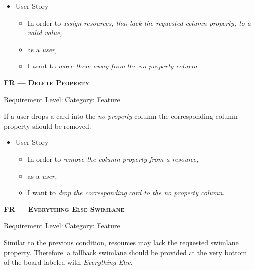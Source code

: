 \begin{itemize}[after=\vspace{1em}]
    \setlength\itemsep{-0.5em}
	\item[] User Story\\[-7.8mm]
	\begin{itemize}
    \setlength\itemsep{-0.5em}
        \item[] In order to \textit{assign resources, that lack the requested column property, to a valid value,}
        \item[] as a \textit{user,}
        \item[] I want to \textit{move them away from the no property column.}
    \end{itemize}
\end{itemize}




\centerline{\textbf{FR\textsubscript{} --- \textsc{Delete Property}}}
\centerline{\small Requirement Level:  \quad{} Category: Feature}

\noindent If a user drops a card into the \textit{no property} column the corresponding column property should be removed.

\begin{itemize}[after=\vspace{1em}]
    \setlength\itemsep{-0.5em}
	\item[] User Story\\[-7.8mm]
	\begin{itemize}
    \setlength\itemsep{-0.5em}
        \item[] In order to \textit{remove the column property from a resource,}
        \item[] as a \textit{user,}
        \item[] I want to \textit{drop the corresponding card to the no property column.}
    \end{itemize}
\end{itemize}





\centerline{\textbf{FR\textsubscript{} --- \textsc{Everything Else Swimlane}}}
\centerline{\small Requirement Level:  \quad{} Category: Feature}

\noindent Similar to the previous condition, resources may lack the requested swimlane property. Therefore, a fallback swimlane should be provided at the very bottom of the board labeled with \textit{Everything Else}.


